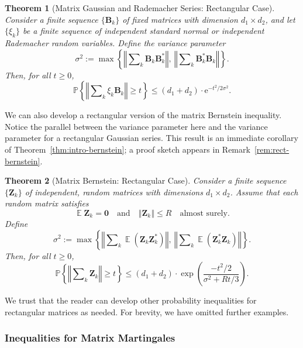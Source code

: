 \documentclass[11pt,letterpaper,twoside,reqno,draft]{amsart}
\newtheorem{thm}{Theorem}
\theoremstyle{remark}
\numberwithin{equation}{section}
\numberwithin{thm}{section}
\begin{document}
\begin{thm}[Matrix Gaussian and Rademacher Series: Rectangular Case]
Consider a finite sequence $\{ {\bm{{B}}}_k \}$ of fixed matrices with dimension $d_1 \times d_2$, and let $\{ \xi_k \}$ be a finite sequence of independent standard normal or independent Rademacher random variables.  Define the variance parameter
$$
\sigma^2 := \max\left\{
	{\left\Vert {{ \sum\nolimits_k {\bm{{B}}}_k {\bm{{B}}}_k^{*} }} \right\Vert}, \
	{\left\Vert {{ \sum\nolimits_k {\bm{{B}}}_k^{*} {\bm{{B}}}_k }} \right\Vert}
\right\}.
$$
Then, for all $t \geq 0$,
$$
{\mathbb{P}\left\{ {{ {\left\Vert {{ \sum\nolimits_k \xi_k {\bm{{B}}}_k }} \right\Vert} \geq t }} \right\}}
	\leq (d_1 + d_2) \cdot {\mathrm{e}}^{-t^2/2\sigma^2}.
$$
\end{thm}

We can also develop a rectangular version of the matrix Bernstein inequality.  Notice the parallel between the variance parameter here and the variance parameter for a rectangular Gaussian series.  This result is an immediate corollary of Theorem~\ref{thm:intro-bernstein}; a proof sketch appears in Remark~\ref{rem:rect-bernstein}.

\begin{thm}[Matrix Bernstein: Rectangular Case] \label{thm:intro-bernstein-rect}
Consider a finite sequence $\{ {\bm{{Z}}}_k \}$ of independent, random matrices with dimensions $d_1 \times d_2$.  Assume that each random matrix satisfies
$$
{\operatorname{\mathbb{E}}} {\bm{{Z}}}_k = {\bm{{0}}}
\quad\text{and}\quad
{\left\Vert {{ {\bm{{Z}}}_k }} \right\Vert} \leq R
\quad\text{almost surely}.
$$
Define
$$
\sigma^2 := \max\left\{ 
	{\left\Vert {{ \sum\nolimits_k {\operatorname{\mathbb{E}}}( {\bm{{Z}}}_k {\bm{{Z}}}_k^{*} ) }} \right\Vert}, \
	{\left\Vert {{ \sum\nolimits_k {\operatorname{\mathbb{E}}}({\bm{{Z}}}_k^{*} {\bm{{Z}}}_k) }} \right\Vert}
\right\}.
$$
Then, for all $t \geq 0$,
$$
{\mathbb{P}\left\{ {{ {\left\Vert {{ \sum\nolimits_k {\bm{{Z}}}_k }} \right\Vert} \geq t }} \right\}}
	\leq (d_1 + d_2) \cdot \exp\left( \frac{-t^2/2}{\sigma^2 + Rt/3} \right).
$$
\end{thm}

We trust that the reader can develop other probability inequalities for rectangular matrices as needed.    For brevity, we have omitted further examples.

\subsubsection{Inequalities for Matrix Martingales}
\end{document}
